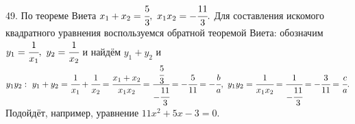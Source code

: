 49. По теореме Виета $x_1+x_2=\cfrac{5}{3},\ x_1x_2=-\cfrac{11}{3}.$ Для составления искомого квадратного уравнения воспользуемся обратной теоремой Виета: обозначим $y_1=\cfrac{1}{x_1},\ y_2=\cfrac{1}{x_2}$ и найдём $y_1+y_2$ и $y_1y_2:\ y_1+y_2=\cfrac{1}{x_1}+\cfrac{1}{x_2}=
\cfrac{x_1+x_2}{x_1x_2}=\cfrac{\cfrac{5}{3}}{-\cfrac{11}{3}}=-\cfrac{5}{11}=-\cfrac{b}{a},\ y_1y_2=\cfrac{1}{x_1x_2}=\cfrac{1}{-\cfrac{11}{3}}=-\cfrac{3}{11}=\cfrac{c}{a}.$ Подойдёт, например, уравнение $11x^2+5x-3=0.$\\
